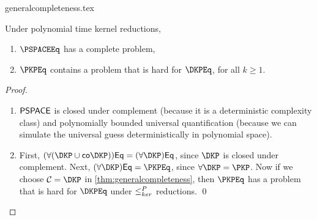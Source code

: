 \begin{filecontents}{generalcompleteness.tex}
\begin{corollary}\label{cor:hardproblems}
  Under polynomial time kernel reductions,
  \begin{enumerate}
  \item $\PSPACEEq$ has a complete problem,
  \item $\PKPEq$ contains a problem that is hard for $\DKPEq$, for all $k \geq 1$.
  \end{enumerate}
\end{corollary}
\begin{proof}\mbox{}
  \begin{enumerate}
  \item $\PSPACE$ is closed under complement (because it is a deterministic complexity class) and polynomially bounded universal quantification (because we can simulate the universal guess deterministically in polynomial space).
  \item
    First, $(\forall(\DKP \cup \mathsf{co}\DKP))\mathsf{Eq} = (\forall \DKP)\mathsf{Eq}$, since $\DKP$ is closed under complement.  %
    Next, $(\forall \DKP)\mathsf{Eq} = \PKPEq$, since $\forall \DKP = \PKP$.  %
    Now if we choose $\mathcal{C} = \DKP$ in \ref{thm:generalcompleteness}, then $\PKPEq$ has a problem that is hard for $\DKPEq$ under $\kr$ reductions.
    \qed
  \end{enumerate}
\end{proof}


\end{filecontents}
